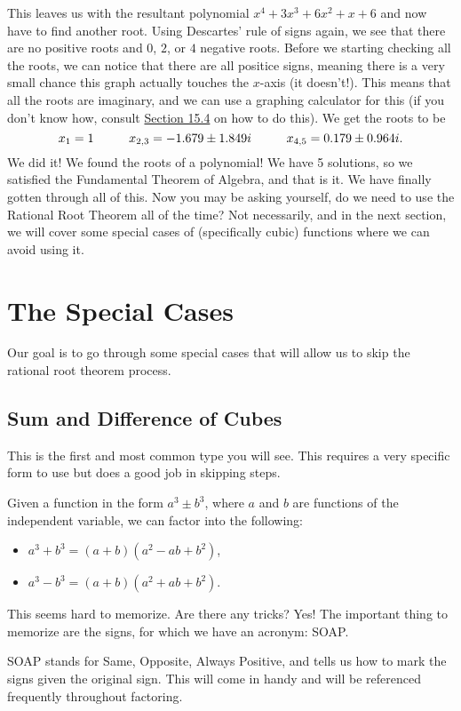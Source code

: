 \documentclass[../book.tex]{subfiles}
\begin{document}

This leaves us with the resultant polynomial $x^4+3x^3+6x^2+x+6$ and now have to find another root.  Using Descartes' rule of signs again, we see that there are no positive roots and $0$, $2$, or $4$ negative roots.  Before we starting checking all the roots, we can notice that there are all positice signs, meaning there is a very small chance this graph actually touches the $x$-axis (it doesn't!). This means that all the roots are imaginary, and we can use a graphing calculator for this (if you don't know how, consult \hyperlink{section.15.4}{Section 15.4} on how to do this).  We get the roots to be $$x_1=1 \hspace{10mm} x_{2,3}=-1.679\pm 1.849i \hspace{10mm} x_{4,5}=0.179\pm 0.964i.$$ 
We did it! We found the roots of a polynomial! We have 5 solutions, so we satisfied the Fundamental Theorem of Algebra, and that is it. We have finally gotten through all of this. Now you may be asking yourself, do we need to use the Rational Root Theorem all of the time? Not necessarily, and in the next section, we will cover some special cases of (specifically cubic) functions where we can avoid using it. 
\section{The Special Cases}
\noindent Our goal is to go through some special cases that will allow us to skip the rational root theorem process.
\subsection{Sum and Difference of Cubes}
\noindent This is the first and most common type you will see.  This requires a very specific form to use but does a good job in skipping steps. 

Given a function in the form $a^3\pm b^3$, where $a$ and $b$ are functions of the independent variable, we can factor into the following: \begin{itemize}
    \item $a^3+b^3=(a+b)(a^2-ab+b^2)$,
    \item $a^3-b^3=(a+b)(a^2+ab+b^2)$.
\end{itemize}
This seems hard to memorize.  Are there any tricks? Yes! The important thing to memorize are the signs, for which we have an acronym: SOAP.

SOAP stands for Same, Opposite, Always Positive, and tells us how to mark the signs given the original sign.  This will come in handy and will be referenced frequently throughout factoring.
\end{document}
